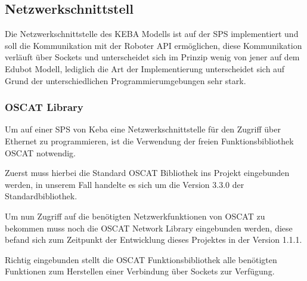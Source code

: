 \subsection{Netzwerkschnittstell}
Die Netzwerkschnittstelle des KEBA Modells ist auf der SPS implementiert und soll die Kommunikation mit der Roboter API ermöglichen, diese Kommunikation verläuft über Sockets und unterscheidet sich im Prinzip wenig von jener auf dem Edubot Modell, lediglich die Art der Implementierung unterscheidet sich auf Grund der unterschiedlichen Programmierumgebungen sehr stark.

\subsubsection{OSCAT Library}
Um auf einer SPS von Keba eine Netzwerkschnittstelle für den Zugriff über Ethernet zu programmieren, ist die Verwendung der freien Funktionsbibliothek OSCAT notwendig. 

Zuerst muss hierbei die Standard OSCAT Bibliothek ins Projekt eingebunden werden, in unserem Fall handelte es sich um die Version 3.3.0 der Standardbibliothek.

Um nun Zugriff auf die benötigten Netzwerkfunktionen von OSCAT zu bekommen muss noch die OSCAT Network Library eingebunden werden, diese befand sich zum Zeitpunkt der Entwicklung dieses Projektes in der Version 1.1.1. 

Richtig eingebunden stellt die OSCAT Funktionsbibliothek alle benötigten Funktionen zum Herstellen einer Verbindung über Sockets zur Verfügung.

